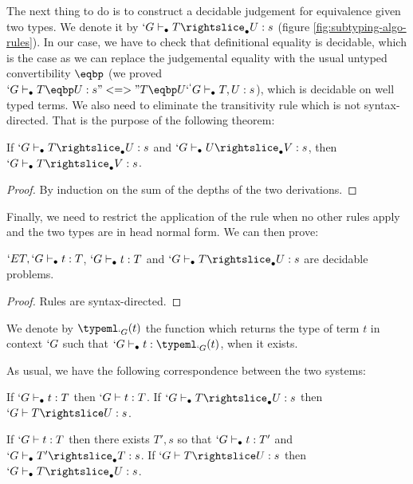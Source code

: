 \documentclass{llncs}
\begin{document}
\begin{paragraph}{}
  The next thing to do is to construct a decidable judgement for
  equivalence given two types. We denote it by $`G \typea T
  \suba U : s$ (figure \ref{fig:subtyping-algo-rules}).
  In our case, we have to check that definitional equality is decidable, which is the
  case as we can replace the judgemental equality with the usual untyped
  convertibility $\eqbp$ (we proved $`G \type T \eqbp U : s
  "<=>" T \eqbp U `^ `G \type T, U : s$), which is decidable on well
  typed terms.
  We also need to eliminate the transitivity rule which is not
  syntax-directed. That is the purpose of the following theorem:
\begin{theorem}
  If $`G \typea T \suba U : s$ and $`G \typea U \suba V : s$, then $`G \typea T
  \suba V : s$.
\end{theorem}
\begin{proof}
  By induction on the sum of the depths of the two derivations.
\end{proof}

  Finally, we need to restrict the application of the 
  rule when no other rules apply and the two types are in head normal form.
  We can then prove:
  \begin{theorem}
    $`E T, `G \vdash_{\bullet} t : T$, $`G \vdash_{\bullet} t : T$ and $`G \typea T \suba U :
    s$ are decidable problems.
  \end{theorem}
  \begin{proof}
    Rules are syntax-directed.
  \end{proof}

  We denote by $\typeafn{`G}{t}$ the function which returns the type of
  term $t$ in context $`G$ such that $`G \typea t : \typeafn{`G}{t}$,
  when it exists.
\end{paragraph}

As usual, we have the following correspondence between the two
systems:
\begin{theorem}[Soundness]
  If $`G \vdash_{\bullet} t : T$ then $`G \vdash t : T$.
  If $`G \typea T \suba{} U : s$ then $`G \typed T \subd U : s$.
\end{theorem}

\begin{theorem}[Completeness]
  If $`G \vdash t : T$ then there exists $T', s$ so that $`G \vdash_{\bullet} t : T'$ and $`G \typea T' \suba T : s$.
  If $`G \typed T \subd U : s$ then $`G \typea T \suba U : s$.
\end{theorem}
\end{document}
